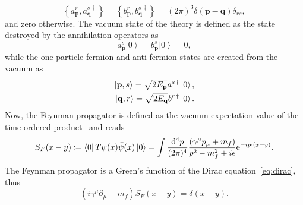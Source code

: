 \begin{equation}
\left\{ a^{r}_\mathbf{p},a^{s\,\dagger}_\mathbf{q}\right\} = \left\{ b^{r}_\mathbf{p},b^{s\,\dagger}_\mathbf{q}\right\} = (2\pi)^3 \delta (\mathbf{p}-\mathbf{q})\delta_{rs},
\end{equation}
and zero otherwise. The vacuum state of the theory is defined as the state destroyed by the annihilation operators as
\begin{equation}
a^s_\mathbf{p}\left|0\right> = b^s_\mathbf{p}\left|0\right> = 0,
\end{equation}
while the one-particle fermion and anti-fermion states are created from the vacuum as
\begin{align}
\left|\mathbf{p},s\right> = \sqrt{2E_\mathbf{p}}a^{s\,\dagger}\left|0\right>,\notag\\
\left|\mathbf{q},r\right> = \sqrt{2E_\mathbf{q}}b^{r\,\dagger}\left|0\right>.
\end{align}
Now, the Feynman propagator is defined as the vacuum expectation value of the time-ordered product~\cite[Section 3.5.]{peskin1995} and reads
\begin{equation}
S_F(x-y)\coloneqq \left<0\right|T\psi(x)\bar{\psi}(x)\left|0\right>=\int \frac{\mathrm{d}^4p}{(2\pi)^4}\frac{ (\gamma^\mu p_\mu+m_f)}{p^2-m_f^2+i\epsilon}\text{e}^{-ip\cdot(x-y)}.
\label{eq:freepropdef}
\end{equation}
The Feynman propagator is a Green's function of the Dirac equation~\eqref{eq:dirac}, thus
\begin{equation}
\left(i\gamma^\mu \partial_\mu -m_f\right)S_F(x-y)=\delta(x-y).
\label{eq:freeprop}
\end{equation} 
